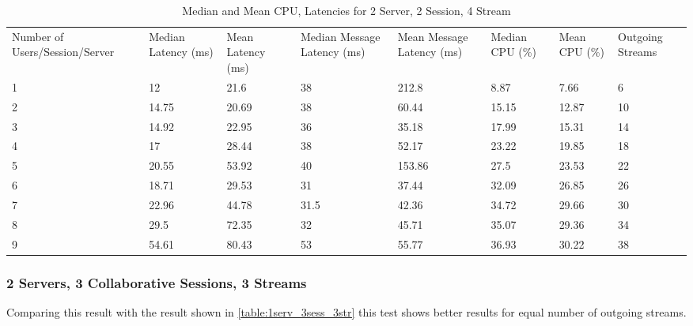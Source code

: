 \begin{table}
\caption{Median and Mean CPU, Latencies for 2 Server, 2 Session, 4 Stream}
\label{table:2serv_2sess_4str}
\begin{tabu} to\linewidth{|X[c]|X[c]|X[c]|X[c]|X[c]|X[c]|X[c]|X[c]|}
\everyrow{\hline}
\hline
Number of Users/Session/Server & Median Latency (ms) & Mean Latency (ms) & Median Message Latency (ms) & Mean Message Latency (ms) & Median CPU (\%) & Mean CPU (\%) & Outgoing Streams\\
1 & 12 & 21.6 & 38 & 212.8 & 8.87 & 7.66 & 6 \\
2 & 14.75 & 20.69 & 38 & 60.44 & 15.15 & 12.87 & 10 \\
3 & 14.92 & 22.95 & 36 & 35.18 & 17.99 & 15.31 & 14 \\
4 & 17 & 28.44 & 38 & 52.17 & 23.22 & 19.85 & 18 \\
5 & 20.55 & 53.92 & 40 & 153.86 & 27.5 & 23.53 & 22 \\
6 & 18.71 & 29.53 & 31 & 37.44 & 32.09 & 26.85 & 26 \\
7 & 22.96 & 44.78 & 31.5 & 42.36 & 34.72 & 29.66 & 30 \\
8 & 29.5 & 72.35 & 32 & 45.71 & 35.07 & 29.36 & 34 \\
9 & 54.61 & 80.43 & 53 & 55.77 & 36.93 & 30.22 & 38 \\
\end{tabu}
\end{table}

\clearpage\subsubsection{2 Servers, 3 Collaborative Sessions, 3 Streams}

Comparing this result with the result shown in \ref{table:1serv_3sess_3str} this test shows better results for equal number of outgoing streams.

